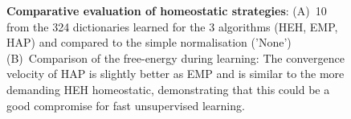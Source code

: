 \documentclass[a4paper, 11pt, draft]{article} %
\newcommand{\seeFig}[1]{Figure~\ref{fig:#1}}%
\begin{document}
\begin{figure}[!ht]%
\caption{
{\bf Comparative evaluation of homeostatic strategies}: %
 {\sf (A)}~10 from the 324 dictionaries learned for the 3 algorithms (HEH, EMP, HAP) and compared to the simple normalisation ('None') {\sf (B)}~Comparison of the free-energy during learning: The convergence velocity of HAP is slightly better as EMP and is similar to the more demanding HEH homeostatic, demonstrating that this could be a good compromise for fast unsupervised learning.
\label{fig:HAP}}%
\end{figure}%
\end{document}
